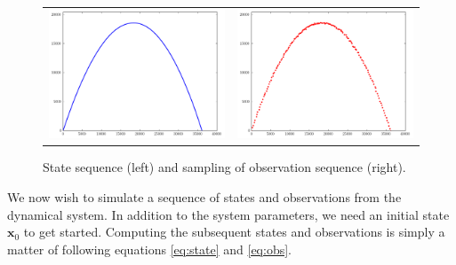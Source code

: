 \begin{figure}
	\centering
    \begin{tabular}{cc}
	\includegraphics[width=.45\textwidth]{states_evolution} &
    \includegraphics[width=.45\textwidth]{obs_evolution}
    \end{tabular}
	\caption{State sequence (left) and sampling of observation sequence (right).}
	\label{fig:evolution}
\end{figure}

We now wish to simulate a sequence of states and observations from the dynamical system. 
In addition to the system parameters, we need an initial state $\mathbf{x}_0$ to get started. 
Computing the subsequent states and observations is simply a matter of following equations \ref{eq:state} and \ref{eq:obs}.


